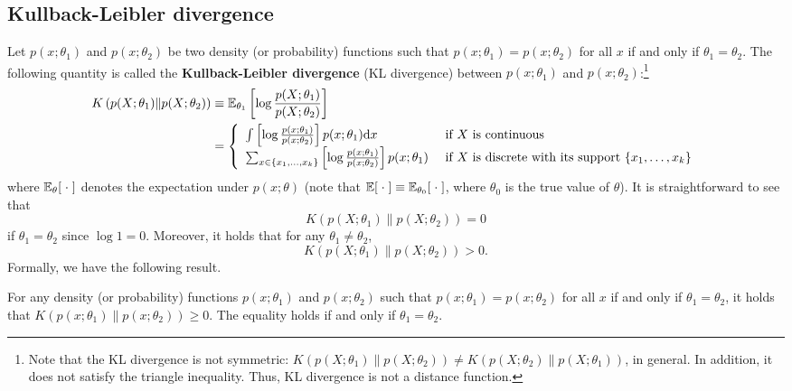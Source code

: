 \documentclass[11pt, A4paper, openany, uplatex]{book}
\begin{document}
\subsection{Kullback-Leibler divergence}

Let $p(x; \theta_1)$ and $p(x; \theta_2)$ be two density (or probability) functions such that $p(x; \theta_1) = p(x; \theta_2)$ for all $x$ if and only if $\theta_1 = \theta_2$.
The following quantity is called the \textbf{Kullback-Leibler divergence}  (KL divergence) between $p(x; \theta_1)$ and $p(x; \theta_2)$:\footnote{
	Note that the KL divergence is not symmetric: $K\left( p(X; \theta_1) \| p(X; \theta_2) \right) \neq K\left( p(X; \theta_2) \| p(X; \theta_1) \right)$, in general.
	In addition, it does not satisfy the triangle inequality.
	Thus, KL divergence is not a distance function. 
	}
\renewcommand{\arraystretch}{1.5}
\begin{align*}
	K\left( p(X; \theta_1) \| p(X; \theta_2) \right)
	& \equiv \mathbb{E}_{\theta_1}\left[\log \frac{p(X; \theta_1)}{p(X; \theta_2)} \right]\\
	& = \left\{ \begin{array}{ll}
		\int \left[\log \frac{p(x; \theta_1)}{p(x; \theta_2)} \right] p(x; \theta_1) \mathrm{d}x & \text{ if $X$ is continuous } \\
		\sum_{x \in \{x_1, \ldots , x_k \}} \left[\log \frac{p(x; \theta_1)}{p(x; \theta_2)} \right] p(x; \theta_1) & \text{ if $X$ is discrete with its support $\{x_1, \ldots, x_k\}$}
	\end{array} \right.
\end{align*}
\renewcommand{\arraystretch}{1}
where $\mathbb{E}_{\theta}[\; \cdot \;]$ denotes the expectation under $p(x; \theta)$ (note that $\mathbb{E}[\; \cdot \;] \equiv \mathbb{E}_{\theta_0}[\; \cdot \; ]$, where $\theta_0$ is the true value of $\theta$).
It is straightforward to see that 
\[
	K\left( p(X; \theta_1) \| p(X; \theta_2) \right) = 0
\]
if $\theta_1 = \theta_2$ since $\log 1 = 0$.
Moreover, it holds that for any $\theta_1 \neq \theta_2$, 
\[
	K\left( p(X; \theta_1) \| p(X; \theta_2) \right) > 0.
\]
Formally, we have the following result.
\begin{theorem}\label{thm:KL}
	For any density (or probability) functions $p(x; \theta_1)$ and $p(x; \theta_2)$ such that $p(x; \theta_1) = p(x; \theta_2)$ for all $x$ if and only if $\theta_1 = \theta_2$, it holds that $K(p(x; \theta_1) \| p(x; \theta_2)) \geq 0$.
	The equality holds if and only if $\theta_1 = \theta_2$.
\end{theorem}
\end{document}
